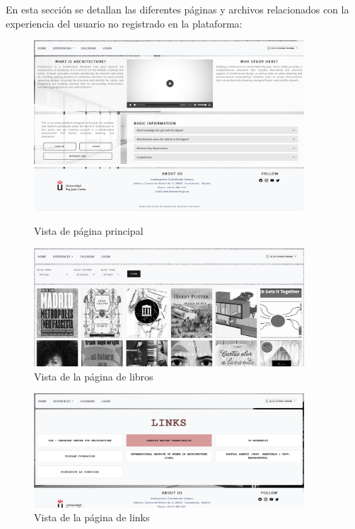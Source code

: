\documentclass[a4paper, 12pt]{book}
\begin{document}
En esta sección se detallan las diferentes páginas y archivos relacionados con la experiencia del usuario no registrado en la plataforma:
\begin{figure}
  \centering
  \includegraphics[width=0.9\textwidth]{img/sitio1.png}
  \includegraphics[width=0.9\textwidth]{img/sitiopie.png}
  \caption{Vista de página principal}
  \label{fig:sitioindex}
\end{figure}
\begin{figure}
  \centering
  \includegraphics[width=0.9\textwidth]{img/booksitio.png}
  \caption{Vista de la página de libros}
  \label{fig:sitiobooks}
\end{figure}
\begin{figure}
  \centering
  \includegraphics[width=0.9\textwidth]{img/linksitio.png}
  \caption{Vista de la página de links}
  \label{fig:sitiolinks}
\end{figure}
\end{document}
